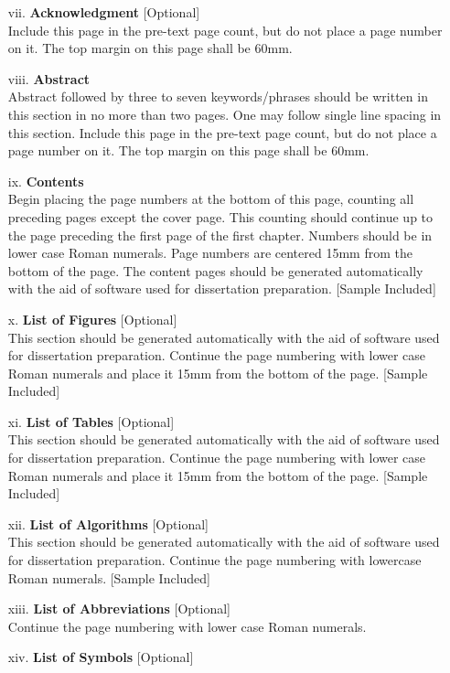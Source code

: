\begin{itemize}
\item[vii.] \textbf{Acknowledgment} [Optional]\\
Include this page in the pre-text page count, but do not place a page number on it. The top margin on this page shall be 60mm. 
\item[viii.] \textbf{Abstract}\\
Abstract followed by three to seven keywords/phrases should be written in this section in no more than two pages. One may follow single line spacing in this section. Include this page in the pre-text page count, but do not place a page number on it. The top margin on this page shall be 60mm. 
\item[ix.] \textbf{Contents}\\
Begin placing the page numbers at the bottom of this page, counting all preceding pages except the cover page. This counting should continue up to the page preceding the first page of the first chapter. Numbers should be in lower case Roman numerals. Page numbers are centered 15mm from the bottom of the page. The content pages should be generated automatically with the aid of software used for dissertation preparation. [Sample Included]
\item[x.] \textbf{List of Figures} [Optional]\\
This section should be generated automatically with the aid of software used for dissertation preparation. Continue the page numbering with lower case Roman numerals and place it 15mm from the bottom of the page. [Sample Included]
\item[xi.] \textbf{List of Tables} [Optional]\\
This section should be generated automatically with the aid of software used for dissertation preparation. Continue the page numbering with lower case Roman numerals and place it 15mm from the bottom of the page. [Sample Included]
\item[xii.] \textbf{List of Algorithms} [Optional]\\
This section should be generated automatically with the aid of software used for dissertation preparation. Continue the page numbering with lowercase Roman numerals. [Sample Included]
\item[xiii.] \textbf{List of Abbreviations} [Optional]\\
Continue the page numbering with lower case Roman numerals.
\item[xiv.] \textbf{List of Symbols} [Optional]\\

\end{itemize}
